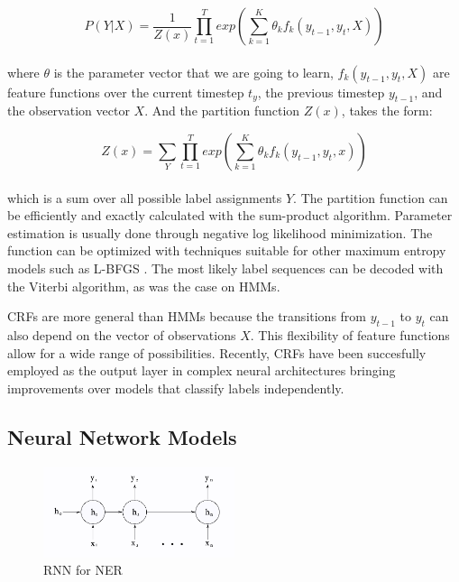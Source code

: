 \documentclass[sigconf]{acmart}
\begin{document}
\begin{equation}
P(Y|X) = \frac{1}{Z(x)} \prod_{t=1}^{T} exp \left( \sum_{k=1}^{K} \theta_k f_k(y_{t-1}, y_t, X) \right)
\end{equation}
\\

where $ \theta $ is the parameter vector that we are going to learn, $ f_k(y_{t-1}, y_{t}, X) $ 
are feature functions over the current timestep $ t_y $, the previous timestep $ y_{t-1}$, 
and the observation vector $ X $. And the partition function $ Z(x) $, takes the form:

\begin{equation}
Z(x) = \sum_{Y} \prod_{t=1}^{T} exp \left( \sum_{k=1}^{K} \theta_k f_k(y_{t-1}, y_t, x) \right)
\end{equation}
\\

which is a sum over all possible label assignments $ Y $. The partition function can be efficiently
and exactly calculated with the sum-product algorithm. Parameter estimation is usually done through 
negative log likelihood minimization. The function can be optimized with techniques suitable for other 
maximum entropy models such as L-BFGS \cite{Liu1989}. The most likely label sequences can be decoded 
with the Viterbi algorithm, as was the case on HMMs.

CRFs are more general than HMMs because the transitions from $ y_{t-1} $ to $ y_{t} $ can also depend 
on the vector of observations $ X $. This flexibility of feature functions allow for a wide range of
possibilities. Recently, CRFs have been succesfully employed as the output layer in complex neural 
architectures bringing improvements over models that classify labels independently.

\subsection{Neural Network Models}

\begin{figure}
  \centering
  \includegraphics[width=0.5\textwidth]{pics/rnn_network}
  \caption{RNN for NER}
  \label{fig:rnn_network}
\end{figure}
\end{document}

